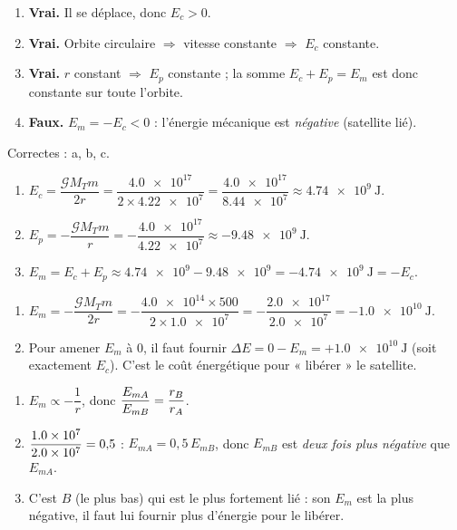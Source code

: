 \documentclass[11pt,a4paper]{article}
\begin{document}

\begin{corrige}
\begin{enumerate}[label=\alph*)]
  \item \textbf{Vrai.} Il se déplace, donc $E_c>0$.
  \item \textbf{Vrai.} Orbite circulaire $\Rightarrow$ vitesse constante $\Rightarrow$
        $E_c$ constante.
  \item \textbf{Vrai.} $r$ constant $\Rightarrow$ $E_p$ constante ; la somme
        $E_c+E_p=E_m$ est donc constante sur toute l'orbite.
  \item \textbf{Faux.} $E_m=-E_c<0$ : l'énergie mécanique est \emph{négative} (satellite lié).
\end{enumerate}
Correctes : a, b, c.
\end{corrige}

\begin{corrige}
\begin{enumerate}[label=\alph*)]
  \item $E_c=\dfrac{\mathcal{G}M_T m}{2r}=\dfrac{\num{4.0e17}}{2\times\num{4.22e7}}
        =\dfrac{\num{4.0e17}}{\num{8.44e7}}\approx\qty{4.74e9}{\joule}$.
  \item $E_p=-\dfrac{\mathcal{G}M_T m}{r}=-\dfrac{\num{4.0e17}}{\num{4.22e7}}
        \approx-\qty{9.48e9}{\joule}$.
  \item $E_m=E_c+E_p\approx\num{4.74e9}-\num{9.48e9}=-\qty{4.74e9}{\joule}=-E_c$. \checkmark
\end{enumerate}
\end{corrige}

\begin{corrige}
\begin{enumerate}[label=\alph*)]
  \item $E_m=-\dfrac{\mathcal{G}M_T m}{2r}=-\dfrac{\num{4.0e14}\times 500}{2\times\num{1.0e7}}
        =-\dfrac{\num{2.0e17}}{\num{2.0e7}}=-\qty{1.0e10}{\joule}$.
  \item Pour amener $E_m$ à $0$, il faut fournir $\Delta E=0-E_m=+\qty{1.0e10}{\joule}$
        (soit exactement $E_c$). C'est le coût énergétique pour « libérer » le satellite.
\end{enumerate}
\end{corrige}

\begin{corrige}
\begin{enumerate}[label=\alph*)]
  \item $E_m\propto-\dfrac1r$, donc $\displaystyle \frac{E_{mA}}{E_{mB}}=\frac{r_B}{r_A}$.
  \item $\displaystyle \frac{\num{1.0e7}}{\num{2.0e7}}=0{,}5$ : $E_{mA}=0{,}5\,E_{mB}$, donc
        $E_{mB}$ est \emph{deux fois plus négative} que $E_{mA}$.
  \item C'est \textbf{$B$} (le plus bas) qui est le plus fortement lié : son $E_m$ est la
        plus négative, il faut lui fournir plus d'énergie pour le libérer.
\end{enumerate}
\end{corrige}
\end{document}
